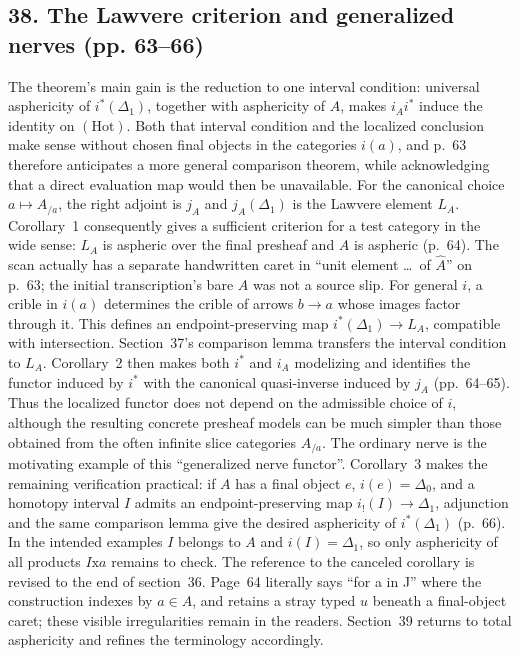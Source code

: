\documentclass[10pt,oneside]{book}
\begin{document}
\subsection*{38. The Lawvere criterion and generalized nerves (pp. 63--66)}
The theorem's main gain is the reduction to one interval condition: universal asphericity of $i^*(\Delta_1)$, together with asphericity of $A$, makes $i_Ai^*$ induce the identity on $(\mathrm{Hot})$. Both that interval condition and the localized conclusion make sense without chosen final objects in the categories $i(a)$, and p.~63 therefore anticipates a more general comparison theorem, while acknowledging that a direct evaluation map would then be unavailable. For the canonical choice $a\mapsto A_{/a}$, the right adjoint is $j_A$ and $j_A(\Delta_1)$ is the Lawvere element $L_A$. Corollary~1 consequently gives a sufficient criterion for a test category in the wide sense: $L_A$ is aspheric over the final presheaf and $A$ is aspheric (p.~64). The scan actually has a separate handwritten caret in ``unit element \ldots\ of $\widehat A$'' on p.~63; the initial transcription's bare $A$ was not a source slip. For general $i$, a crible in $i(a)$ determines the crible of arrows $b\to a$ whose images factor through it. This defines an endpoint-preserving map $i^*(\Delta_1)\to L_A$, compatible with intersection. Section~37's comparison lemma transfers the interval condition to $L_A$. Corollary~2 then makes both $i^*$ and $i_A$ modelizing and identifies the functor induced by $i^*$ with the canonical quasi-inverse induced by $j_A$ (pp.~64--65). Thus the localized functor does not depend on the admissible choice of $i$, although the resulting concrete presheaf models can be much simpler than those obtained from the often infinite slice categories $A_{/a}$. The ordinary nerve is the motivating example of this ``generalized nerve functor''. Corollary~3 makes the remaining verification practical: if $A$ has a final object $e$, $i(e)=\Delta_0$, and a homotopy interval $I$ admits an endpoint-preserving map $i_!(I)\to\Delta_1$, adjunction and the same comparison lemma give the desired asphericity of $i^*(\Delta_1)$ (p.~66). In the intended examples $I$ belongs to $A$ and $i(I)=\Delta_1$, so only asphericity of all products $I\mathrm{x}a$ remains to check. The reference to the canceled corollary is revised to the end of section~36. Page~64 literally says ``for a in J'' where the construction indexes by $a\in A$, and retains a stray typed $u$ beneath a final-object caret; these visible irregularities remain in the readers. Section~39 returns to total asphericity and refines the terminology accordingly.
\end{document}
